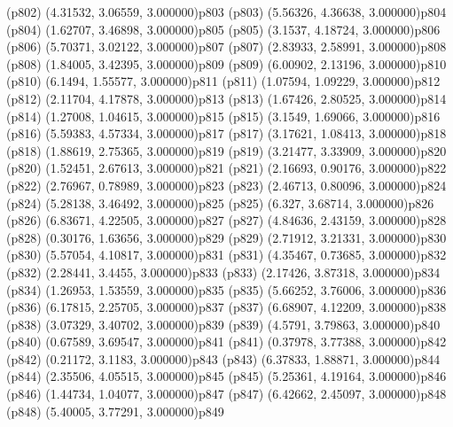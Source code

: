 \psdot(p802)
\psPoint(4.31532, 3.06559, 3.000000){p803}
\psdot(p803)
\psPoint(5.56326, 4.36638, 3.000000){p804}
\psdot(p804)
\psPoint(1.62707, 3.46898, 3.000000){p805}
\psdot(p805)
\psPoint(3.1537, 4.18724, 3.000000){p806}
\psdot(p806)
\psPoint(5.70371, 3.02122, 3.000000){p807}
\psdot(p807)
\psPoint(2.83933, 2.58991, 3.000000){p808}
\psdot(p808)
\psPoint(1.84005, 3.42395, 3.000000){p809}
\psdot(p809)
\psPoint(6.00902, 2.13196, 3.000000){p810}
\psdot(p810)
\psPoint(6.1494, 1.55577, 3.000000){p811}
\psdot(p811)
\psPoint(1.07594, 1.09229, 3.000000){p812}
\psdot(p812)
\psPoint(2.11704, 4.17878, 3.000000){p813}
\psdot(p813)
\psPoint(1.67426, 2.80525, 3.000000){p814}
\psdot(p814)
\psPoint(1.27008, 1.04615, 3.000000){p815}
\psdot(p815)
\psPoint(3.1549, 1.69066, 3.000000){p816}
\psdot(p816)
\psPoint(5.59383, 4.57334, 3.000000){p817}
\psdot(p817)
\psPoint(3.17621, 1.08413, 3.000000){p818}
\psdot(p818)
\psPoint(1.88619, 2.75365, 3.000000){p819}
\psdot(p819)
\psPoint(3.21477, 3.33909, 3.000000){p820}
\psdot(p820)
\psPoint(1.52451, 2.67613, 3.000000){p821}
\psdot(p821)
\psPoint(2.16693, 0.90176, 3.000000){p822}
\psdot(p822)
\psPoint(2.76967, 0.78989, 3.000000){p823}
\psdot(p823)
\psPoint(2.46713, 0.80096, 3.000000){p824}
\psdot(p824)
\psPoint(5.28138, 3.46492, 3.000000){p825}
\psdot(p825)
\psPoint(6.327, 3.68714, 3.000000){p826}
\psdot(p826)
\psPoint(6.83671, 4.22505, 3.000000){p827}
\psdot(p827)
\psPoint(4.84636, 2.43159, 3.000000){p828}
\psdot(p828)
\psPoint(0.30176, 1.63656, 3.000000){p829}
\psdot(p829)
\psPoint(2.71912, 3.21331, 3.000000){p830}
\psdot(p830)
\psPoint(5.57054, 4.10817, 3.000000){p831}
\psdot(p831)
\psPoint(4.35467, 0.73685, 3.000000){p832}
\psdot(p832)
\psPoint(2.28441, 3.4455, 3.000000){p833}
\psdot(p833)
\psPoint(2.17426, 3.87318, 3.000000){p834}
\psdot(p834)
\psPoint(1.26953, 1.53559, 3.000000){p835}
\psdot(p835)
\psPoint(5.66252, 3.76006, 3.000000){p836}
\psdot(p836)
\psPoint(6.17815, 2.25705, 3.000000){p837}
\psdot(p837)
\psPoint(6.68907, 4.12209, 3.000000){p838}
\psdot(p838)
\psPoint(3.07329, 3.40702, 3.000000){p839}
\psdot(p839)
\psPoint(4.5791, 3.79863, 3.000000){p840}
\psdot(p840)
\psPoint(0.67589, 3.69547, 3.000000){p841}
\psdot(p841)
\psPoint(0.37978, 3.77388, 3.000000){p842}
\psdot(p842)
\psPoint(0.21172, 3.1183, 3.000000){p843}
\psdot(p843)
\psPoint(6.37833, 1.88871, 3.000000){p844}
\psdot(p844)
\psPoint(2.35506, 4.05515, 3.000000){p845}
\psdot(p845)
\psPoint(5.25361, 4.19164, 3.000000){p846}
\psdot(p846)
\psPoint(1.44734, 1.04077, 3.000000){p847}
\psdot(p847)
\psPoint(6.42662, 2.45097, 3.000000){p848}
\psdot(p848)
\psPoint(5.40005, 3.77291, 3.000000){p849}
